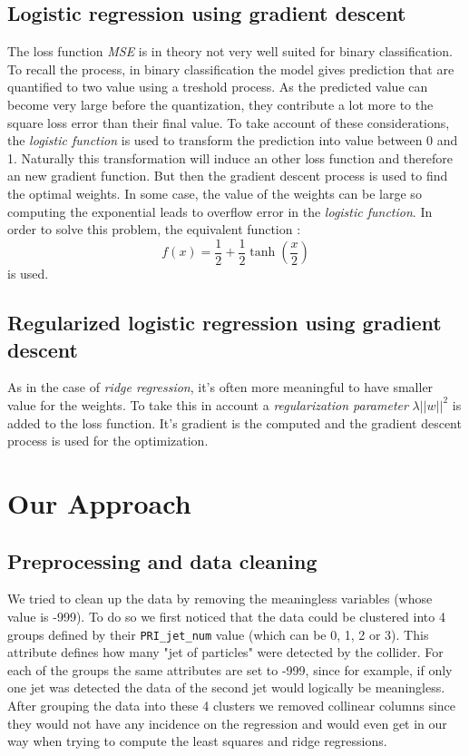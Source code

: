 \documentclass[10pt,conference,compsocconf]{IEEEtran}
\begin{document}
\subsection{Logistic regression using gradient descent}
The loss function \textit{MSE} is in theory not very well suited for binary classification. To recall the process, in binary classification the model gives prediction that are quantified to two value using a treshold process. As the predicted value can become very large before the quantization, they contribute a lot more to the square loss error than their final value. To take account of these considerations, the \textit{logistic function} is used to transform the prediction into value between 0 and 1. Naturally this transformation will induce an other loss function and therefore an new gradient function. But then the gradient descent process is used to find the optimal weights. In some case, the value of the weights can be large so computing the exponential leads to overflow error in the \textit{logistic function}. In order to solve this problem, the equivalent function : 
\begin{equation}
f(x) = \frac{1}{2}+\frac{1}{2}\tanh \left(\frac{x}{2}\right)
\end{equation} 
is used.
\subsection{Regularized logistic regression using gradient descent}

As in the case of \textit{ridge regression}, it's often more meaningful to have smaller value for the weights. To take this in account a \textit{regularization parameter} $\lambda \vert\vert w \vert\vert ^2$ is added to the loss function. It's gradient is the computed and the gradient descent process is used for the optimization.

\section{Our Approach}

\subsection{Preprocessing and data cleaning}
We tried to clean up the data by removing the meaningless variables (whose value is -999). To do so we first noticed that the data could be clustered into 4 groups defined by their \texttt{PRI\_jet\_num} value (which can be 0, 1, 2 or 3). This attribute defines how many "jet of particles" were detected by the collider. For each of the groups the same attributes are set to -999, since for example, if only one jet was detected the data of the second jet would logically be meaningless. After grouping the data into these 4 clusters we removed collinear columns since they would not have any incidence on the regression and would even get in our way when trying to compute the least squares and ridge regressions.
\end{document}
